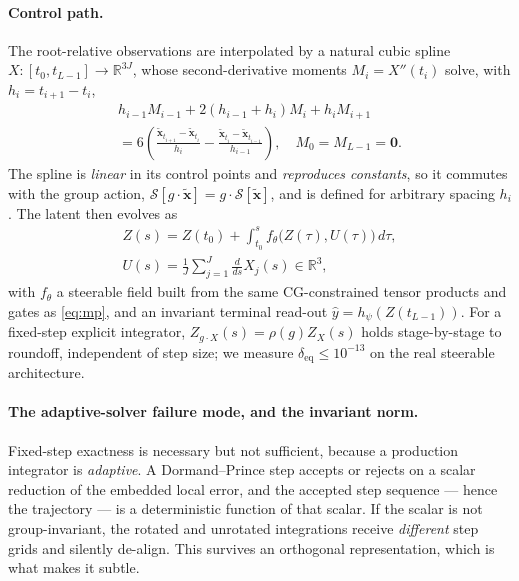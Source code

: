 \documentclass[10pt,journal]{IEEEtran}
\begin{document}
\paragraph{Control path.} The root-relative observations are interpolated by a natural cubic spline
$X:[t_0,t_{L-1}]\to\mathbb{R}^{3J}$, whose second-derivative moments $M_i=X''(t_i)$ solve, with
$h_i=t_{i+1}-t_i$,
%
\begin{equation}
\label{eq:spline-moments}
\begin{gathered}
h_{i-1}M_{i-1}+2(h_{i-1}+h_i)M_i+h_iM_{i+1}\\
=6\!\left(\frac{\tilde{\bm{x}}_{t_{i+1}}-\tilde{\bm{x}}_{t_i}}{h_i}
-\frac{\tilde{\bm{x}}_{t_i}-\tilde{\bm{x}}_{t_{i-1}}}{h_{i-1}}\right),
\quad M_0=M_{L-1}=\bm{0}.
\end{gathered}
\end{equation}
%
The spline is \emph{linear} in its control points and \emph{reproduces constants}, so it commutes with
the group action, $\mathcal{S}[g\cdot\tilde{\bm{x}}]=g\cdot\mathcal{S}[\tilde{\bm{x}}]$, and is defined
for arbitrary spacing $h_i$. The latent then evolves as
%
\begin{equation}
\label{eq:cde}
\begin{gathered}
Z(s)=Z(t_0)+\int_{t_0}^{s}f_\theta\big(Z(\tau),U(\tau)\big)\,d\tau,\\[2pt]
U(s)=\frac1J\sum_{j=1}^{J}\frac{d}{ds}X_j(s)\in\mathbb{R}^3,
\end{gathered}
\end{equation}
%
with $f_\theta$ a steerable field built from the same CG-constrained tensor products and gates as
\eqref{eq:mp}, and an invariant terminal read-out $\hat y=h_\psi(Z(t_{L-1}))$. For a fixed-step
explicit integrator, $Z_{g\cdot X}(s)=\rho(g)Z_X(s)$ holds stage-by-stage to roundoff, independent of
step size; we measure $\delta_{\text{eq}}\le10^{-13}$ on the real steerable architecture.

\paragraph{The adaptive-solver failure mode, and the invariant norm.} Fixed-step exactness is
necessary but not sufficient, because a production integrator is \emph{adaptive}. A Dormand--Prince
step accepts or rejects on a scalar reduction of the embedded local error, and the accepted step
sequence --- hence the trajectory --- is a deterministic function of that scalar. If the scalar is not
group-invariant, the rotated and unrotated integrations receive \emph{different} step grids and
silently de-align. This survives an orthogonal representation, which is what makes it subtle.
\end{document}
